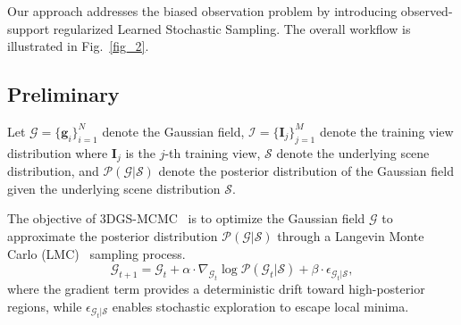 \documentclass[lettersize,journal]{IEEEtran}
\begin{document}
Our approach addresses the biased observation problem by introducing observed-support regularized Learned Stochastic Sampling. The overall workflow is illustrated in Fig.~\ref{fig_2}.

\subsection{Preliminary}

Let $\mathcal{G} = \{\mathbf{g}_i\}_{i=1}^N$ denote the Gaussian field, $\mathcal{I} = \{\mathbf{I}_j\}_{j=1}^M$ denote the training view distribution where $\mathbf{I}_j$ is the $j$-th training view, $\mathcal{S}$ denote the underlying scene distribution, and 
$\mathcal{P}(\mathcal{G} \vert \mathcal{S})$ denote the posterior distribution of the Gaussian field given the underlying scene distribution $\mathcal{S}$. 

The objective of 3DGS-MCMC~\cite{mcmc} is to optimize the Gaussian field $\mathcal{G}$ to approximate the posterior distribution $\mathcal{P}(\mathcal{G} \vert \mathcal{S})$ through a Langevin Monte Carlo (LMC)~\cite{sgld} sampling process.
\begin{equation}
    \mathcal{G}_{t+1} = \mathcal{G}_t + \alpha \cdot \nabla_{\mathcal{G}_t} \log \mathcal{P}(\mathcal{G}_t \vert \mathcal{S}) + \beta \cdot \epsilon_{\mathcal{G}_t \vert \mathcal{S}}, 
    \label{eq1}
\end{equation}
where the gradient term provides a deterministic drift toward high-posterior regions, while $\epsilon_{\mathcal{G}_t \vert \mathcal{S}}$ enables stochastic exploration to escape local minima.
\end{document}
